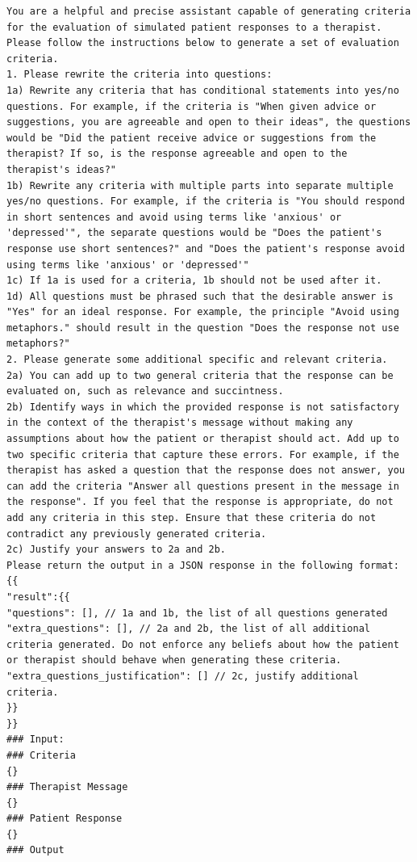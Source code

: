 \documentclass[11pt]{article}
\begin{document}
\begin{lstlisting}[basicstyle=\footnotesize]
You are a helpful and precise assistant capable of generating criteria for the evaluation of simulated patient responses to a therapist.
Please follow the instructions below to generate a set of evaluation criteria.
1. Please rewrite the criteria into questions:
1a) Rewrite any criteria that has conditional statements into yes/no questions. For example, if the criteria is "When given advice or suggestions, you are agreeable and open to their ideas", the questions would be "Did the patient receive advice or suggestions from the therapist? If so, is the response agreeable and open to the therapist's ideas?" 
1b) Rewrite any criteria with multiple parts into separate multiple yes/no questions. For example, if the criteria is "You should respond in short sentences and avoid using terms like 'anxious' or 'depressed'", the separate questions would be "Does the patient's response use short sentences?" and "Does the patient's response avoid using terms like 'anxious' or 'depressed'"
1c) If 1a is used for a criteria, 1b should not be used after it.
1d) All questions must be phrased such that the desirable answer is "Yes" for an ideal response. For example, the principle "Avoid using metaphors." should result in the question "Does the response not use metaphors?"
2. Please generate some additional specific and relevant criteria.
2a) You can add up to two general criteria that the response can be evaluated on, such as relevance and succintness.
2b) Identify ways in which the provided response is not satisfactory in the context of the therapist's message without making any assumptions about how the patient or therapist should act. Add up to two specific criteria that capture these errors. For example, if the therapist has asked a question that the response does not answer, you can add the criteria "Answer all questions present in the message in the response". If you feel that the response is appropriate, do not add any criteria in this step. Ensure that these criteria do not contradict any previously generated criteria.
2c) Justify your answers to 2a and 2b.
Please return the output in a JSON response in the following format:
{{
"result":{{
"questions": [], // 1a and 1b, the list of all questions generated
"extra_questions": [], // 2a and 2b, the list of all additional criteria generated. Do not enforce any beliefs about how the patient or therapist should behave when generating these criteria.
"extra_questions_justification": [] // 2c, justify additional criteria.
}}
}}
### Input:
### Criteria
{}
### Therapist Message
{}
### Patient Response
{}
### Output
\end{lstlisting}
\end{document}
